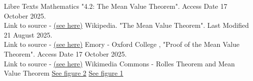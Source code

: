 \documentclass{article}
\theoremstyle{plain}
\theoremstyle{definition}
\begin{document}
\begin{thebibliography}{100}
        Libre Texts Mathematics "4.2: The Mean Value Theorem". Access Date 17 October 2025.\\Link to source - \href{https://math.libretexts.org/Bookshelves/Calculus/Map%3A_Calculus__Early_Transcendentals_(Stewart)/04%3A_Applications_of_Differentiation/4.02%3A_The_Mean_Value_Theorem}{(see here)}
        Wikipedia. "The Mean Value Theorem". Last Modified 21 August 2025.\\Link to source - 
       \href{https://en.wikipedia.org/wiki/Mean_value_theorem}{(see here)}
        Emory - Oxford College , "Proof of the Mean Value Theorem". Access Date 17 October 2025.\\Link to source - \href{https://math.oxford.emory.edu/site/math111/proofs/meanValueTheorem/}{(see here)}
        Wikimedia Commons - Rolles Theorem and Mean Value Theorem \href{fig:MVT}{See figure 2} \href{fig:rolles}{See figure 1}
       
\end{thebibliography}
\end{document}
